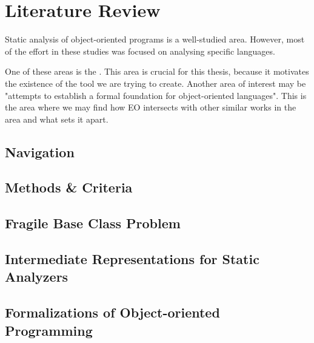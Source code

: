 \chapter{Literature Review}
\label{chap:lr}
Static analysis of object-oriented programs is a well-studied area. However, most of the effort in these studies was focused on analysing specific languages.

One of these areas is the . This area is crucial for this thesis, because it motivates the existence of the tool we are trying to create. Another area of interest may be "attempts to establish a formal foundation for object-oriented languages". This is the area where we may find how EO intersects with other similar works in the area and what sets it apart. 
\section{Navigation}

\section{Methods \& Criteria}

\section{Fragile Base Class Problem}

\section{Intermediate Representations for Static Analyzers}

\section{Formalizations of Object-oriented Programming}



\newpage
